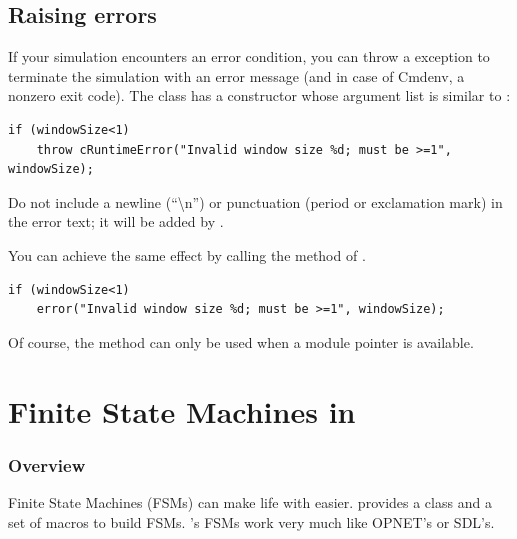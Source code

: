 \subsection{Raising errors}

If your simulation encounters an error condition, you can throw a
 exception to terminate the simulation with
an error message (and in case of Cmdenv, a nonzero exit code).
The  class has a constructor whose argument list
is similar to :

\begin{verbatim}
if (windowSize<1)
    throw cRuntimeError("Invalid window size %d; must be >=1", windowSize);
\end{verbatim}

Do not include a newline (``{\textbackslash}n'') or punctuation (period
or exclamation mark) in the error text; it will be added by {\opp}.

You can achieve the same effect by calling the  method of
.

\begin{verbatim}
if (windowSize<1)
    error("Invalid window size %d; must be >=1", windowSize);
\end{verbatim}

Of course, the  method can only be used when a module pointer
is available.



\section{Finite State Machines in {\opp}}

\subsubsection{Overview}


Finite State Machines (FSMs)
can make life with  easier. {\opp} provides a
class and a set of macros to build FSMs. {\opp}'s FSMs work very much
like OPNET's or SDL's.



